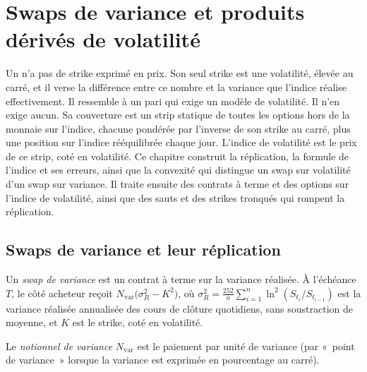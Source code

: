 \chapter{Swaps de variance et produits dérivés de volatilité}\label{ch:dv:variance-swaps-and-volatility-derivatives}

Un  n'a pas de strike exprimé en prix. Son seul strike est une volatilité, élevée au carré, et il verse la différence
entre ce nombre et la variance que l'indice réalise effectivement. Il ressemble à un pari qui exige un modèle de
volatilité. Il n'en exige aucun. Sa couverture est un strip statique de toutes les options hors de la monnaie sur l'indice, chacune
pondérée par l'inverse de son strike au carré, plus une position sur l'indice rééquilibrée chaque jour. L'indice de
volatilité est le prix de ce strip, coté en volatilité. Ce chapitre construit la réplication, la formule de l'indice et ses
erreurs, ainsi que la convexité qui distingue un swap sur volatilité d'un swap sur variance.
Il traite ensuite des contrats à terme et des options sur l'indice de volatilité, ainsi que des sauts et des strikes tronqués qui
rompent la réplication.

\section{Swaps de variance et leur réplication}

\begin{definition}\label{def:dv:variance-swaps-and-volatility-derivatives:vs}
Un \emph{swap de variance} est un contrat à terme sur la variance réalisée. À l'échéance $T$, le
côté acheteur reçoit $N_{\mathrm{var}}\bigl(\sigma_R^2-K^2\bigr)$, où
$\sigma_R^2=\frac{252}{n}\sum_{i=1}^n\ln^2(S_{t_i}/S_{t_{i-1}})$ est la variance réalisée annualisée des cours de clôture quotidiens, sans
soustraction de moyenne, et $K$ est le strike, coté en volatilité.
\end{definition}

\begin{definition}\label{def:dv:variance-swaps-and-volatility-derivatives:varnot}
Le \emph{notionnel de variance} $N_{\mathrm{var}}$ est le paiement par unité de variance
(par «~point de variance~» lorsque la variance est exprimée en pourcentage au carré).
\end{definition}

